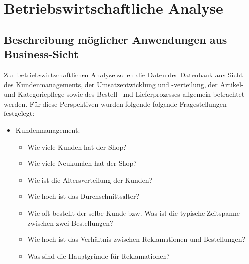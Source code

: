 \section{Betriebswirtschaftliche Analyse}
\subsection{Beschreibung möglicher Anwendungen aus Business-Sicht}
Zur betriebswirtschaftlichen Analyse sollen die Daten der Datenbank aus Sicht des Kundenmanagements, der Umsatzentwicklung und -verteilung, der Artikel- und Kategoriepflege sowie des Bestell- und Lieferprozesses allgemein betrachtet werden. Für diese Perspektiven wurden folgende folgende Fragestellungen festgelegt:  
\begin{itemize}
  \item Kundenmanagement:
  	\begin{itemize}
    	\item Wie viele Kunden hat der Shop? 
    	\item Wie viele Neukunden hat der Shop?
    	\item Wie ist die Altersverteilung der Kunden?
    	\item Wie hoch ist das Durchschnittsalter?
   	 	\item Wie oft bestellt der selbe Kunde bzw. Was ist die typische Zeitspanne zwischen zwei Bestellungen?
    	\item Wie hoch ist das Verhältnis zwischen Reklamationen und Bestellungen?
    	\item Was sind die Hauptgründe für Reklamationen?
 

\end{itemize}
\end{itemize}
